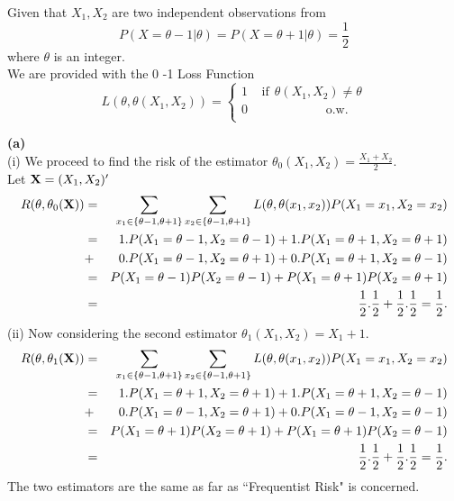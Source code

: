 Given that $X_1, X_2$ are two independent observations from
\begin{equation*}
P(X=\theta-1|\theta)=P(X=\theta+1|\theta)=\frac{1}{2}
\end{equation*}
where $\theta$ is an integer. \\
We are provided with the 0 -1 Loss Function
$$
L(\theta,\theta(X_1,X_2))=\left\{\begin{array}{c}
1\:\:\:\:\:\mbox{if}\:\:\theta(X_1,X_2)\neq \theta\\
0\:\:\:\:\:\:\:\:\:\:\:\:\:\:\:\:\:\:\:\:\:\:\:\:\:\:\:\:\mbox{o.w.}\\
\end{array}
\right.
$$

\textbf{(a)} \\(i) We proceed to find the risk of the estimator $\theta_0(X_1,X_2)=\frac{X_1+X_2}{2}$. \\
Let $\hbox{\bf X}=(X_1,X_2)'$
\begin{eqnarray}
R(\theta,\theta_0(\hbox{\bf X})) &=& \sum_{x_1\in\{\theta-1,\theta+1\}}\sum_{x_2\in\{\theta-1,\theta+1\}}L(\theta,\theta(x_1,x_2))P(X_1=x_1,X_2=x_2)\nonumber\\
&=& 1. P(X_1=\theta-1,X_2=\theta-1)+1.P(X_1=\theta+1,X_2=\theta+1)\nonumber\\
&+& 0.P(X_1=\theta-1,X_2=\theta+1)+0.P(X_1=\theta+1,X_2=\theta-1)\nonumber\\
&=& P(X_1=\theta-1)P(X_2=\theta-1)+P(X_1=\theta+1)P(X_2=\theta+1)\nonumber\\
&=& {{1}\over{2}}.{{1}\over{2}}+{{1}\over{2}}.{{1}\over{2}}={{1}\over{2}}.\nonumber
\end{eqnarray}
(ii) Now considering the second estimator $\theta_1(X_1,X_2)=X_1+1$.
\begin{eqnarray}
R(\theta,\theta_1(\hbox{\bf X})) &=& \sum_{x_1\in\{\theta-1,\theta+1\}}\sum_{x_2\in\{\theta-1,\theta+1\}}L(\theta,\theta(x_1,x_2))P(X_1=x_1,X_2=x_2)\nonumber\\
&=& 1. P(X_1=\theta+1,X_2=\theta+1)+1.P(X_1=\theta+1,X_2=\theta-1)\nonumber\\
&+& 0.P(X_1=\theta-1,X_2=\theta+1)+0.P(X_1=\theta-1,X_2=\theta-1)\nonumber\\
&=& P(X_1=\theta+1)P(X_2=\theta+1)+P(X_1=\theta+1)P(X_2=\theta-1)\nonumber\\
&=& {{1}\over{2}}.{{1}\over{2}}+{{1}\over{2}}.{{1}\over{2}}={{1}\over{2}}.\nonumber
\end{eqnarray}
The two estimators are the same as far as ``Frequentist Risk" is concerned.\\



